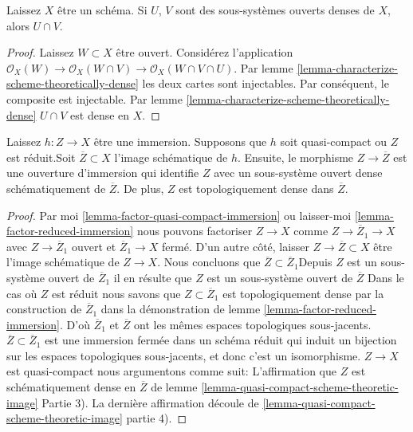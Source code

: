 \begin{lemma}

\label{lemma-intersection-scheme-theoretically-dense}
Laissez $X$ être un schéma. Si $U$, $V$ sont des sous-systèmes ouverts denses de $X$, alors $U \cap V$.
\end{lemma}

\begin{proof}
Laissez $W \subset X$ être ouvert. Considérez l'application $\mathcal{O}_X(W) \to \mathcal{O}_X(W \cap V)
\to \mathcal{O}_X(W \cap V \cap U)$. Par lemme \ref{lemma-characterize-scheme-theoretically-dense} les deux cartes sont injectables. Par conséquent, le composite est injectable. Par lemme \ref{lemma-characterize-scheme-theoretically-dense} $U \cap V$ est dense en $X$.
\end{proof}

\begin{lemma}

\label{lemma-quasi-compact-immersion}
Laissez $h : Z \to X$ être une immersion. Supposons que $h$ soit quasi-compact ou $Z$ est réduit.Soit $\overline{Z} \subset X$ l'image schématique de $h$. Ensuite, le morphisme $Z \to \overline{Z}$ est une ouverture d'immersion qui identifie $Z$ avec un sous-système ouvert dense schématiquement de $\overline{Z}$. De plus, $Z$ est topologiquement dense dans $\overline{Z}$.
\end{lemma}

\begin{proof}

Par moi \ref{lemma-factor-quasi-compact-immersion} ou laisser-moi \ref{lemma-factor-reduced-immersion} nous pouvons factoriser
$Z \to X$ comme $Z \to \overline{Z}_1 \to X$ avec $Z \to \overline{Z}_1$
ouvert et $\overline{Z}_1 \to X$ fermé. D'un autre côté, laisser
$Z \to \overline{Z} \subset X$ être l'image schématique de
$Z \to X$. Nous concluons que $\overline{Z} \subset \overline{Z}_1$Depuis $Z$ est un sous-système ouvert de $\overline{Z}_1$ il en résulte que $Z$ est un sous-système ouvert de $\overline{Z}$ Dans le cas où $Z$ est réduit nous savons que $Z \subset \overline{Z}_1$
est topologiquement dense par la construction de $\overline{Z}_1$ dans la démonstration de lemme \ref{lemma-factor-reduced-immersion}. D'où $\overline{Z}_1$ et $\overline{Z}$ ont les mêmes espaces topologiques sous-jacents. $\overline{Z} \subset \overline{Z}_1$
est une immersion fermée dans un schéma réduit qui induit un bijection sur les espaces topologiques sous-jacents, et donc c'est un isomorphisme. $Z \to X$ est quasi-compact nous argumentons comme suit: L'affirmation que $Z$ est schématiquement dense en
$\overline{Z}$ de lemme \ref{lemma-quasi-compact-scheme-theoretic-image} Partie 3). La dernière affirmation découle de \ref{lemma-quasi-compact-scheme-theoretic-image} partie 4).

\end{proof}


